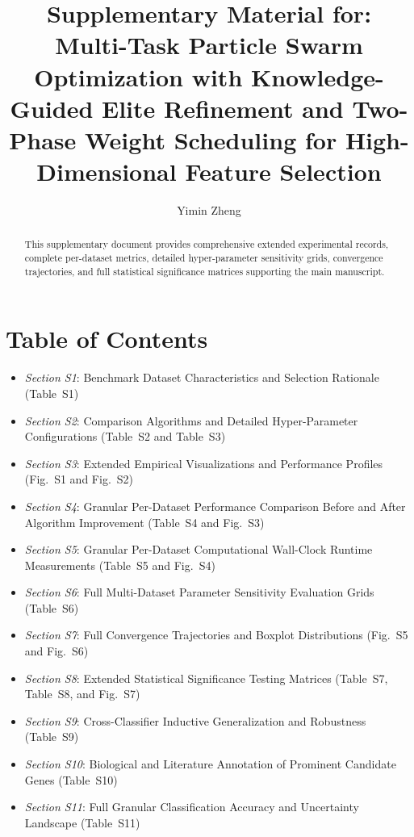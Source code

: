 \documentclass[final,1p,times,fleqn]{elsarticle}
\begin{document}
\begin{frontmatter}

\title{Supplementary Material for:\\Multi-Task Particle Swarm Optimization with Knowledge-Guided Elite Refinement and Two-Phase Weight Scheduling for High-Dimensional Feature Selection}

\author{Yimin Zheng}
\address{Jiangxi University of Water Resources and Electric Power, Nanchang 330099, China}

\begin{abstract}
This supplementary document provides comprehensive extended experimental records, complete per-dataset metrics, detailed hyper-parameter sensitivity grids, convergence trajectories, and full statistical significance matrices supporting the main manuscript.
\end{abstract}

\end{frontmatter}

\section*{Table of Contents}
\begin{itemize}
    \item \textit{Section S1}: Benchmark Dataset Characteristics and Selection Rationale (Table~S1)
    \item \textit{Section S2}: Comparison Algorithms and Detailed Hyper-Parameter Configurations (Table~S2 and Table~S3)
    \item \textit{Section S3}: Extended Empirical Visualizations and Performance Profiles (Fig.~S1 and Fig.~S2)
    \item \textit{Section S4}: Granular Per-Dataset Performance Comparison Before and After Algorithm Improvement (Table~S4 and Fig.~S3)
    \item \textit{Section S5}: Granular Per-Dataset Computational Wall-Clock Runtime Measurements (Table~S5 and Fig.~S4)
    \item \textit{Section S6}: Full Multi-Dataset Parameter Sensitivity Evaluation Grids (Table~S6)
    \item \textit{Section S7}: Full Convergence Trajectories and Boxplot Distributions (Fig.~S5 and Fig.~S6)
    \item \textit{Section S8}: Extended Statistical Significance Testing Matrices (Table~S7, Table~S8, and Fig.~S7)
    \item \textit{Section S9}: Cross-Classifier Inductive Generalization and Robustness (Table~S9)
    \item \textit{Section S10}: Biological and Literature Annotation of Prominent Candidate Genes (Table~S10)
    \item \textit{Section S11}: Full Granular Classification Accuracy and Uncertainty Landscape (Table~S11)
\end{itemize}
\end{document}
